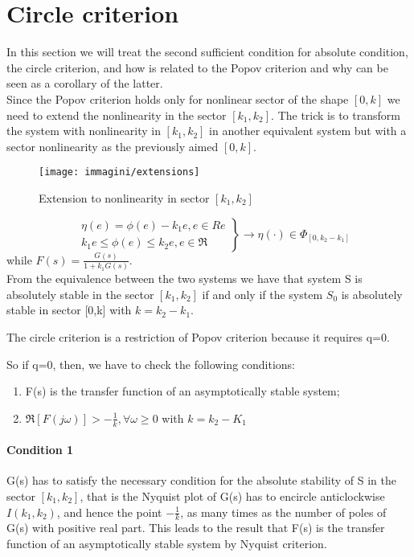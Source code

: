 \section{Circle criterion}
In this section we will treat the second sufficient condition for absolute condition, the circle criterion, and how is related to the Popov criterion and why can be seen as a corollary of the latter.\\
Since the Popov criterion holds only for nonlinear sector of the shape $[0,k]$ we need to extend the nonlinearity in the sector $[k_1,k_2]$. The trick is to transform the system with nonlinearity in  $[k_1,k_2]$  in another equivalent system but with a sector nonlinearity as the previously aimed $[0,k]$.
\begin{figure}[H]
	\centering
	\texttt{[image: immagini/extensions]}
	\caption{Extension to nonlinearity in sector $[k_1,k_2]$}
	\label{fig:extensions}
\end{figure}
\[
\left.
\begin{aligned}
	& \eta(e)=\phi(e)-k_1e, e\in Re	\\
	& k_1e\le \phi(e)\le k_2e,e \in \Re
\end{aligned}
\right\rbrace
\to \eta(\cdot)\in \Phi_{[0,k_2-k_1]}
\]while $F(s)=\frac{G(s)}{1+k_1G(s)}$.\\
From the equivalence between the two systems we have that system S is absolutely stable in the sector $[k_1,k_2]$ if and only if the system $S_0$ is absolutely stable in sector [0,k] with $k=k_2-k_1$.
\begin{note}
	The circle criterion is a restriction of Popov criterion because it requires q=0.
\end{note}
So if q=0, then, we have to check the following conditions:
\begin{enumerate}
	\item F(s) is the transfer function of an asymptotically stable system;
	\item $\Re[F(j\omega)]>-\frac{1}{k}, \forall \omega \ge0$ with $k=k_2-K_1$
\end{enumerate}
\paragraph{Condition 1} G(s) has to satisfy the necessary condition for the absolute stability of S in the sector $[k_1,k_2]$, that is the Nyquist plot of G(s) has to encircle anticlockwise $I(k_1,k_2)$, and hence the point $-\frac{1}{k}$, as many times as the number of poles of G(s) with positive real part. This leads to the result that F(s) is the transfer function of an asymptotically stable system by Nyquist criterion.

